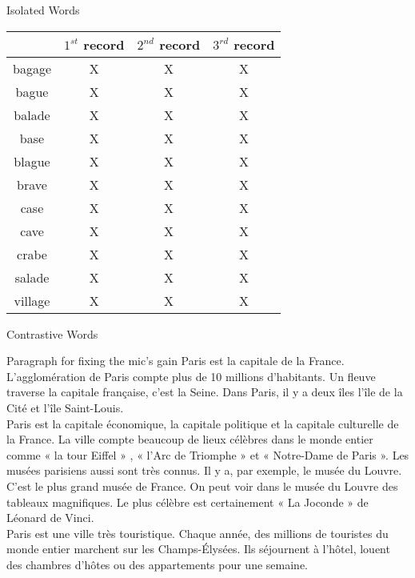 \documentclass[11pt]{beamer}
\begin{document}
\begin{frame}{Isolated Words}
\begin{tabular}{|c|c|c|c|}
\hline 
 &  $1^{st}$ record  & $2^{nd}$ record & $3^{rd}$ record \\ 
\hline 
 bagage& X & X & X \\ 
\hline 
bague
 & X & X & X \\ 
\hline 
balade & X & X & X \\ 
\hline 
base & X & X & X \\ 
\hline 
blague & X & X & X \\ 
\hline 
brave & X & X & X \\ 
\hline 
case & X & X & X \\ 
\hline 
cave & X & X & X \\ 
\hline 
crabe & X & X & X \\ 
\hline 
salade & X & X & X \\ 
\hline 
village & X & X & X \\ 
\hline 
\end{tabular} 
\end{frame}
\begin{frame}{Contrastive Words}

\end{frame}
\begin{frame}{Paragraph for fixing the mic's gain}
Paris est la capitale de la France. L’agglomération de Paris compte plus de 10 millions d’habitants. Un fleuve traverse la capitale française, c’est la Seine. Dans Paris, il y a deux îles \:  l’île de la Cité et l’île Saint-Louis.\\
Paris est la capitale économique, la capitale politique et la capitale culturelle de la France. La ville compte beaucoup de lieux célèbres dans le monde entier comme « la tour Eiffel » , « l’Arc de Triomphe » et « Notre-Dame de Paris ». Les musées parisiens aussi sont très connus. Il y a, par exemple, le musée du Louvre. C’est le plus grand musée de France. On peut voir dans le musée du Louvre des tableaux magnifiques. Le plus célèbre est certainement « La Joconde » de Léonard de Vinci.\\
Paris est une ville très touristique. Chaque année, des millions de touristes du monde entier marchent sur les Champs-Élysées. Ils séjournent à l’hôtel, louent des chambres d’hôtes ou des appartements pour une semaine.




\end{frame}
\end{document}
